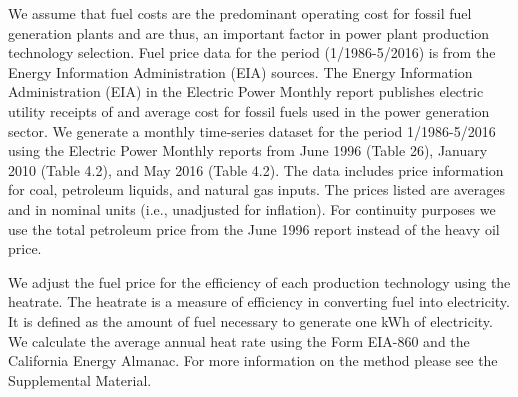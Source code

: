 \documentclass[10pt]{amsart}
\begin{document}
We assume that fuel costs are the predominant operating cost for fossil fuel generation plants and are thus, an important factor in power plant production technology selection.
Fuel price data for the period (1/1986-5/2016) is from the Energy Information Administration (EIA) sources.
The Energy Information Administration (EIA) in the Electric Power Monthly report publishes electric utility receipts of and average cost for fossil fuels used in the power generation sector.
We generate a monthly time-series dataset for the period 1/1986-5/2016 using the Electric Power Monthly reports from June 1996 (Table 26), January 2010 (Table 4.2), and May 2016 (Table 4.2). 
The data includes price information for coal, petroleum liquids, and natural gas inputs.
The prices listed are averages and in nominal units (i.e., unadjusted for inflation).
For continuity purposes we use the total petroleum price from the June 1996 report instead of the heavy oil price.  

We adjust the fuel price for the efficiency of each production technology using the heatrate.
The heatrate is a measure of efficiency in converting fuel into electricity. 
It is defined as the amount of fuel necessary to generate one kWh of electricity. 
We calculate the average annual heat rate using the Form EIA-860 and the California Energy Almanac.
For more information on the method please see the Supplemental Material.
\end{document}
